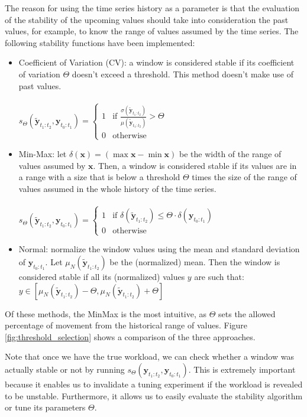 \documentclass[a4paper, 12pt]{article} %
\begin{document}
	The reason for using the time series history as a parameter is that the evaluation of the stability of the upcoming values should take into consideration the past values, for example, to know the range of values assumed by the time series. The following stability functions have been implemented:
	\begin{itemize}
		\item Coefficient of Variation (CV): a window is considered stable if its coefficient of variation $\Theta$ doesn't exceed a threshold. This method doesn't make use of past values.\\\\
		$
		s_\Theta(\tilde{\pmb{y}}_{t_1:t_2}, \pmb{y}_{t_0:t_1}) = \begin{cases}
			1 & \text{if } \frac{\sigma (\tilde{\pmb{y}}_{t_1:t_2})}{\mu (\tilde{\pmb{y}}_{t_1:t_2})} > \Theta\\
			0 & \text{otherwise}
		\end{cases}    
		$
		\item Min-Max: let $\delta (\pmb{x}) = (\max{\pmb{x}} - \min{\pmb{x}})$ be the width of the range of values assumed by $\pmb{x}$. Then, a window is considered stable if its values are in a range with a size that is below a threshold $\Theta$ times the size of the range of values assumed in the whole history of the time series.\\\\
		$
		s_\Theta(\tilde{\pmb{y}}_{t_1:t_2}, \pmb{y}_{t_0:t_1}) = \begin{cases}
			1 & \text{if } \delta (\tilde{\pmb{y}}_{t_1:t_2}) \leq \Theta \cdot \delta (\pmb{y}_{t_0:t_1}) \\
			0 & \text{otherwise}
		\end{cases}    
		$
		\item Normal: normalize the window values using the mean and standard deviation of $\pmb{y}_{t_0:t_1}$. Let $\mu_N (\tilde{\pmb{y}}_{t_1:t_2})$ be the (normalized) mean. Then the window is considered stable if all its (normalized) values $y$ are such that: $y \in [\mu_N (\tilde{\pmb{y}}_{t_1:t_2}) - \Theta, \mu_N (\tilde{\pmb{y}}_{t_1:t_2}) + \Theta]$
	\end{itemize}
	Of these methods, the MinMax is the most intuitive, as $\Theta$ sets the allowed percentage of movement from the historical range of values. Figure \ref{fig:threshold_selection} shows a comparison of the three approaches.
	
	Note that once we have the true workload, we can check whether a window was actually stable or not by running $s_\Theta(\pmb{y}_{t_1:t_2}, \pmb{y}_{t_0:t_1})$. This is extremely important because it enables us to invalidate a tuning experiment if the workload is revealed to be unstable. Furthermore, it allows us to easily evaluate the stability algorithm or tune its parameters $\Theta$.
	
\end{document}
